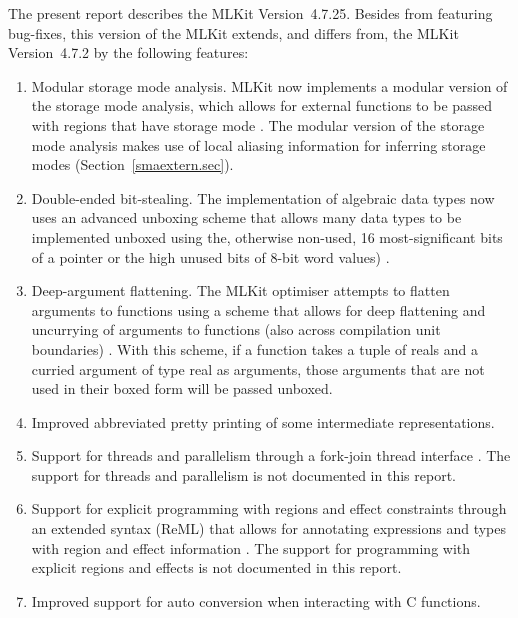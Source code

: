 \documentclass[12pt]{book}
\newcommand{\docversion}{4.7.25}
\begin{document}
The present report describes the
%
\index{MLKit!Version \docversion}%
%
MLKit Version~{\docversion}. Besides from featuring bug-fixes, this version of
the MLKit extends, and differs from, the MLKit Version~4.7.2 by the following
features:
\begin{enumerate}
\item
  Modular storage mode analysis. MLKit now implements a modular version of the
  storage mode analysis, which allows for external functions to be passed with
  regions that have storage mode . The modular version of the storage
  mode analysis makes use of local aliasing information for inferring storage
  modes (Section~\ref{smaextern.sec}).
\item
  Double-ended bit-stealing. The implementation of algebraic data types now
  uses an advanced unboxing scheme that allows many data types to be implemented
  unboxed using the, otherwise non-used, 16 most-significant bits of a pointer
  or the high unused bits of 8-bit word values) \cite{10.1145/3674628}.

\item
  Deep-argument flattening. The MLKit optimiser attempts to flatten
  arguments to functions using a scheme that allows for deep flattening and
  uncurrying of arguments to functions (also across compilation unit boundaries)
  \cite{deep-elsman25}. With this scheme, if a function takes a tuple of reals
  and a curried argument of type real as arguments, those arguments that are not
  used in their boxed form will be passed unboxed.

\item Improved abbreviated pretty printing of some intermediate representations.

\item
  Support for threads and parallelism through a fork-join thread interface
  \cite{10.1145/3591256}. The support for threads and parallelism is not
  documented in this report.

\item
  Support for explicit programming with regions and effect constraints
  through an extended syntax (ReML) that allows for annotating expressions and
  types with region and effect information \cite{10.1145/3632921}. The support
  for programming with explicit regions and effects is not documented in this
  report.

\item
  Improved support for auto conversion when interacting with C functions.
\end{enumerate}
\end{document}
